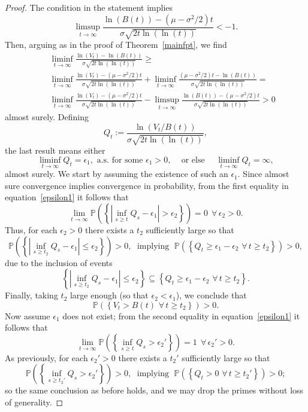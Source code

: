 \documentclass[12pt]{article}
\theoremstyle{definition}
\begin{document}
\begin{proof}
The condition in the statement implies
$$
\limsup_{t \to \infty} \frac{\ln(B(t))-(\mu - \sigma^2/2)t}{\sigma \sqrt{2t \ln(\ln(t))}} <-1.
$$
Then, arguing as in the proof of Theorem~\ref{mainfpt}, we find
\begin{eqnarray}\nonumber
&& \liminf_{t \to \infty} \frac{\ln(V_t)-\ln(B(t))}{\sigma \sqrt{2t \ln(\ln(t))}} \ge \\ \nonumber
&& \liminf_{t \to \infty} \frac{\ln(V_t)-(\mu - \sigma^2/2)t}{\sigma \sqrt{2t \ln(\ln(t))}} + \liminf_{t \to \infty} \frac{(\mu - \sigma^2/2)t-\ln(B(t))}{\sigma \sqrt{2t \ln(\ln(t))}} = \\ \nonumber
&& \liminf_{t \to \infty} \frac{\ln(V_t)-(\mu - \sigma^2/2)t}{\sigma \sqrt{2t \ln(\ln(t))}} - \limsup_{t \to \infty} \frac{\ln(B(t))-(\mu - \sigma^2/2)t}{\sigma \sqrt{2t \ln(\ln(t))}} >0
\end{eqnarray}
almost surely. Defining
$$Q_t:= \frac{\ln(V_t/B(t))}{\sigma \sqrt{2t \ln(\ln(t))}},$$
the last result means either
\begin{equation}\label{epsilon1}
\liminf_{t \to \infty} Q_t = \epsilon_1,\text{ a.s. for some $\epsilon_1 >0$,}\quad\text{ or else } \quad
\liminf_{t \to \infty} Q_t = \infty,
\end{equation}
almost surely. We start by assuming the existence of such an $\epsilon_1$. Since almost sure convergence implies convergence in probability, from the first equality in equation~\eqref{epsilon1} it follows that
$$
\lim_{t \to \infty} \mathbb{P}\left( \left\lbrace\left| \inf_{s \ge t} Q_s -\epsilon_1 \right| > \epsilon_2 \right\rbrace\right)=0\;\, \forall \, \epsilon_2>0.
$$
Thus, for each $\epsilon_2>0$ there exists a $t_2$ sufficiently large so that
$$
\mathbb{P}\left(\left\lbrace \left| \inf_{s \ge t_2} Q_s-\epsilon_1 \right| \le \epsilon_2 \right\rbrace \right)>0,
\;\text{ implying }\;
\mathbb{P}\left( \left\{ Q_t\ge \epsilon_1 - \epsilon_2 \,\, \forall \, t \ge t_2 \right\} \right)>0,
$$
due to the inclusion of events
$$ \left\lbrace \left| \inf_{s \ge t_2} Q_s -\epsilon_1 \right| \le \epsilon_2 \right\rbrace \subseteq \left\{ Q_t \ge \epsilon_1 - \epsilon_2 \,\, \forall \, t \ge t_2 \right\}.
$$
Finally, taking $t_2$ large enough (so that $\epsilon_2 < \epsilon_1$), we conclude that
$$
\mathbb{P}\left( \left\{ V_t > B(t) \,\, \forall \, t \ge t_2 \right\} \right)>0.
$$
Now assume $\epsilon_1$ does not exist; from the second equality in equation~\eqref{epsilon1} it follows that
$$
\lim_{t \to \infty} \mathbb{P}\left( \left\lbrace \inf_{s \ge t} Q_s > \epsilon_2' \right\rbrace\right)=1\;\, \forall \, \epsilon_2'>0.
$$
As previously, for each $\epsilon_2'>0$ there exists a $t_2'$ sufficiently large so that
$$
\mathbb{P}\left(\left\lbrace \inf_{s \ge t_2'} Q_s > \epsilon_2' \right\rbrace \right)>0,
\;\text{ implying }\;
\mathbb{P}\left( \left\{  Q_t > 0 \,\, \forall \, t \ge t_2' \right\} \right)>0;
$$
so the same conclusion as before holds, and we may drop the primes without loss of generality.


\end{proof}
\end{document}
